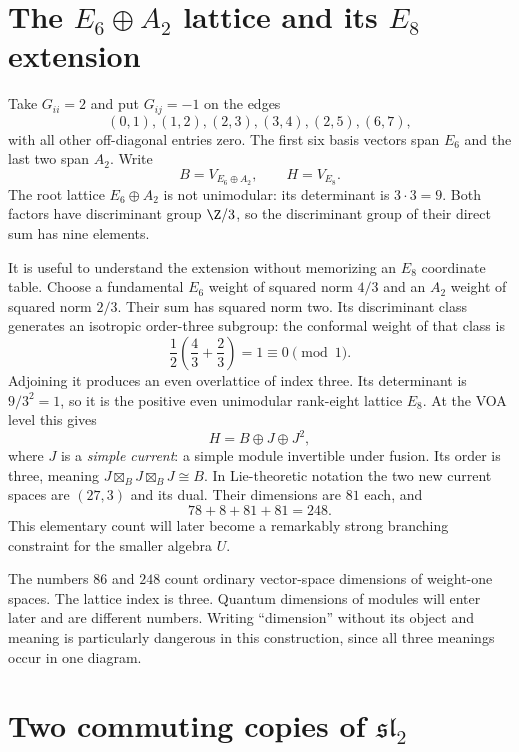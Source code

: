 \section{\texorpdfstring{The $E_6\oplus A_2$ lattice and its $E_8$ extension}{The E6+A2 lattice and its E8 extension}}

Take $G_{ii}=2$ and put $G_{ij}=-1$ on the edges
\[
 (0,1),(1,2),(2,3),(3,4),(2,5),(6,7),
\]
with all other off-diagonal entries zero. The first six basis vectors
span $E_6$ and the last two span $A_2$. Write
\[
 B=V_{E_6\oplus A_2},\qquad H=V_{E_8}.
\]
The root lattice $E_6\oplus A_2$ is not unimodular: its determinant is
$3\cdot3=9$. Both factors have discriminant group $\Z/3$, so the
discriminant group of their direct sum has nine elements.

It is useful to understand the extension without memorizing an $E_8$
coordinate table. Choose a fundamental $E_6$ weight of squared norm
$4/3$ and an $A_2$ weight of squared norm $2/3$. Their sum has squared norm
two. Its discriminant class generates an isotropic order-three subgroup:
the conformal weight of that class is
\[
 \frac12\left(\frac43+\frac23\right)=1\equiv0\pmod1.
\]
Adjoining it produces an even overlattice of index three. Its determinant
is $9/3^2=1$, so it is the positive even unimodular rank-eight lattice
$E_8$. At the VOA level this gives
\begin{equation}\label{eq:c-e8-three-branch}
 H=B\oplus J\oplus J^2,
\end{equation}
where $J$ is a \emph{simple current}: a simple module invertible under
fusion. Its order is three, meaning $J\boxtimes_B J\boxtimes_B J\cong B$.
In Lie-theoretic notation
the two new current spaces are $(27,3)$ and its dual. Their dimensions
are $81$ each, and
\[
 78+8+81+81=248.
\]
This elementary count will later become a remarkably strong branching
constraint for the smaller algebra $U$.

\begin{remark}
The numbers $86$ and $248$ count ordinary vector-space dimensions of
weight-one spaces. The lattice index is three. Quantum dimensions of
modules will enter later and are different numbers. Writing
``dimension'' without its object and meaning is particularly dangerous
in this construction, since all three meanings occur in one diagram.
\end{remark}

\section{\texorpdfstring{Two commuting copies of $\mathfrak{sl}_2$}{Two commuting copies of sl2}}

